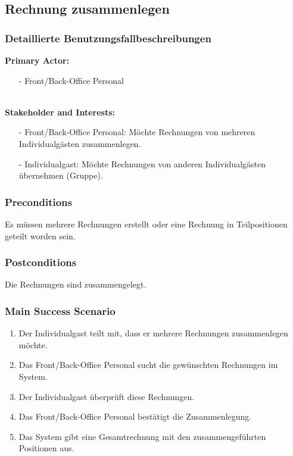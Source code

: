 \documentclass[./detailed_overview_usecases.tex]{subfiles}
\begin{document}
    \subsection{Rechnung zusammenlegen}
    \subsubsection{Detaillierte Benutzungsfallbeschreibungen}
    \textbf{Primary Actor:}
    \begin{itemize}
        \item [-]  Front/Back-Office Personal
    \end{itemize}
    \\
    \textbf{Stakeholder and Interests:}
    \begin{itemize}
        \item[-] Front/Back-Office Personal: Möchte Rechnungen von mehreren Individualgästen zusammenlegen.
        \item[-] Individualgast: Möchte Rechnungen von anderen Individualgästen übernehmen (Gruppe).
    \end{itemize}

    \subsubsection*{Preconditions}
    Es müssen mehrere Rechnungen erstellt oder eine Rechnung in Teilpositionen geteilt worden sein.

    \subsubsection*{Postconditions}
    Die Rechnungen sind zusammengelegt.

    \subsubsection*{Main Success Scenario}
    \begin{enumerate}
        \item Der Individualgast teilt mit, dass er mehrere Rechnungen zusammenlegen möchte.
        \item Das Front/Back-Office Personal sucht die gewünschten Rechnungen im System.
        \item Der Individualgast überprüft diese Rechnungen.
        \item Das Front/Back-Office Personal bestätigt die Zusammenlegung.
        \item Das System gibt eine Gesamtrechnung mit den zusammengeführten Positionen aus.
    \end{enumerate}
\end{document}
